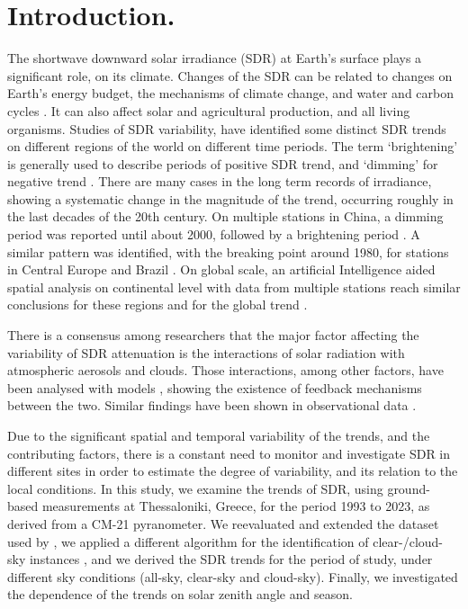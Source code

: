 \documentclass[applsci,article,submit,moreauthors,pdftex]{Definitions/mdpi}
\begin{document}

\hypertarget{introduction.}{%
\section{Introduction.}\label{introduction.}}

The shortwave downward solar irradiance (SDR) at Earth's surface plays a
significant role, on its climate. Changes of the SDR can be related to
changes on Earth's energy budget, the mechanisms of climate change, and
water and carbon cycles \citep{Wild2009}. It can also affect solar and
agricultural production, and all living organisms. Studies of SDR
variability, have identified some distinct SDR trends on different
regions of the world on different time periods. The term `brightening'
is generally used to describe periods of positive SDR trend, and
`dimming' for negative trend \citep{Wild2009}. There are many cases in
the long term records of irradiance, showing a systematic change in the
magnitude of the trend, occurring roughly in the last decades of the
20th century. On multiple stations in China, a dimming period was
reported until about 2000, followed by a brightening period
\citep{Yang2021}. A similar pattern was identified, with the breaking
point around 1980, for stations in Central Europe \citep{Wild2021} and
Brazil \citep{Yamasoe2021}. On global scale, an artificial Intelligence
aided spatial analysis on continental level with data from multiple
stations reach similar conclusions for these regions and for the global
trend \citep{Yuan2021}.

There is a consensus among researchers that the major factor affecting
the variability of SDR attenuation is the interactions of solar
radiation with atmospheric aerosols and clouds. Those interactions,
among other factors, have been analysed with models
\citep{Li2016, Samset2018}, showing the existence of feedback mechanisms
between the two. Similar findings have been shown in observational data
\citep[ and references
therein]{Schwarz2020, Ohvril2009, Zerefos2009, Xia2007}.

Due to the significant spatial and temporal variability of the trends,
and the contributing factors, there is a constant need to monitor and
investigate SDR in different sites in order to estimate the degree of
variability, and its relation to the local conditions. In this study, we
examine the trends of SDR, using ground-based measurements at
Thessaloniki, Greece, for the period 1993 to 2023, as derived from a
CM-21 pyranometer. We reevaluated and extended the dataset used by
\citet{Bais2013}, we applied a different algorithm for the
identification of clear-/cloud-sky instances
\citep{Reno2016, Reno2012a}, and we derived the SDR trends for the
period of study, under different sky conditions (all-sky, clear-sky and
cloud-sky). Finally, we investigated the dependence of the trends on
solar zenith angle and season.
\end{document}
